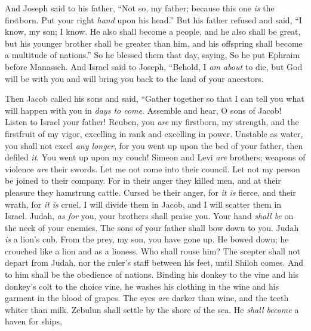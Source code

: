 \begin{biblechapter}
\verse And Joseph said to his father, “Not so, my father; because this one \textit{is} the firstborn. Put your right \textit{hand} upon his head.”
\verse But his father refused and said, “I know, my son; I know. He also shall become a people, and he also shall be great, but his younger brother shall be greater than him, and his offspring shall become a multitude of nations.”
\verse So he blessed them that day, saying,
\verse So he put Ephraim before Manasseh.
\verse And Israel said to Joseph, “Behold, I \textit{am about} to die, but God will be with you and will bring you back to the land of your ancestors.
\end{biblechapter}

\begin{biblechapter} %
 Then Jacob called his sons and said, “Gather together so that I can tell you what will happen with you in \textit{days to come}.
\verse Assemble and hear, O sons of Jacob! 
Listen to Israel your father!
\verse Reuben, you \textit{are} my firstborn, 
my strength, and the firstfruit of my vigor, 
excelling in rank and excelling in power.
\verse Unstable as water, you shall not excel \textit{any longer}, 
for you went up upon the bed of your father, 
then defiled \textit{it}. You went up upon my couch!
\verse Simeon and Levi \textit{are} brothers; 
weapons of violence \textit{are} their swords. 
Let me not come into their council.
\verse Let not my person be joined to their company. 
For in their anger they killed men, 
and at their pleasure they hamstrung cattle.
\verse Cursed be their anger, for \textit{it is} fierce, 
and their wrath, for \textit{it is} cruel. 
I will divide them in Jacob, 
and I will scatter them in Israel.
\verse Judah, \textit{as for} you, your brothers shall praise you. 
Your hand \textit{shall be} on the neck of your enemies. 
The sons of your father shall bow down to you.
\verse Judah \textit{is} a lion’s cub. 
From the prey, my son, you have gone up. 
He bowed down; he crouched like a lion and as a lioness. 
Who shall rouse him?
\verse The scepter shall not depart from Judah, 
nor the ruler’s staff between his feet, 
until Shiloh comes. 
And to him shall be the obedience of nations.
\verse Binding his donkey to the vine 
and his donkey’s colt to the choice vine, 
he washes his clothing in the wine 
and his garment in the blood of grapes.
\verse The eyes \textit{are} darker than wine, 
and the teeth whiter than milk.
\verse Zebulun shall settle by the shore of the sea. 
He \textit{shall become} a haven for ships, 

\end{biblechapter}
